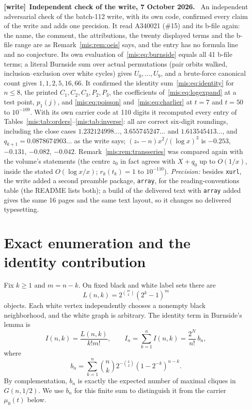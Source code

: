 \documentclass[11pt]{article}
\theoremstyle{remark}\newtheorem{remark}[theorem]{Remark}
\newenvironment{writenote}[1][]{\par\smallskip\begingroup\small
 \noindent\textbf{[write]}\if\relax\detokenize{#1}\relax\else~\textbf{#1.}\fi\ }%
 {\par\endgroup\smallskip}
\begin{document}
\begin{writenote}[Independent check of the write, 7 October 2026]
An independent adversarial check of the batch-112 write, with its own code,
confirmed every claim of the write and adds one precision. It read A340021
(\#15) and its b-file again: the name, the comment, the attributions, the
twenty displayed terms and the b-file range are as Remark~\ref{mis:rem:oeis}
says, and the entry has no formula line and no conjecture. Its own evaluation
of~\eqref{mis:eq:burnside} equals all 41 b-file terms; a literal Burnside sum
over actual permutations (pair orbits walked, inclusion--exclusion over white
cycles) gives $U_0,\ldots,U_9$, and a brute-force canonical count gives
$1,1,2,5,16,66$. It confirmed the identity sum~\eqref{mis:eq:identity} for
$n\le8$, the printed $C_1,C_2,C_3,P_2,P_3$, the coefficients
of~\eqref{mis:eq:logexpand} at a test point, $p_1(j)$, and
\eqref{mis:eq:poisson} and~\eqref{mis:eq:charlier} at $t=7$ and $t=50$ to
$10^{-109}$. With its own carrier code at 110 digits it recomputed every entry
of Tables~\ref{mis:tab:orders}--\ref{mis:tab:inverse}: all are correct
six-digit roundings, including the close cases $1.232124998\ldots$,
$3.655745247\ldots$ and $1.613545413\ldots$, and
$q_{k+1}=0.0878674903\ldots$ as the write says; $(z_*-n)x^2/(\log x)^3$ is
$-0.253$, $-0.131$, $-0.082$, $-0.042$. Remark~\ref{mis:rem:transseries} was
compared again with the volume's statements (the centre $z_0$ in fact agrees
with $X+q_0$ up to $O(1/x)$, inside the stated $O(\log x/x)$; $r_k(t_k)=1$
to $10^{-110}$). \emph{Precision:} besides \texttt{xurl}, the write added a
second preamble package, \texttt{array}, for the reading-conventions table (the
README lists both); a build of the delivered text with \texttt{array} added
gives the same 16 pages and the same text layout, so it changes no delivered
typesetting.
\end{writenote}

\section{Exact enumeration and the identity contribution}
Fix $k\ge1$ and $m=n-k$. On fixed black and white label sets there are
\[
 L(n,k)=2^{\binom m2}(2^k-1)^m
\]
objects. Each white vertex independently chooses a nonempty black neighborhood, and the white graph is arbitrary. The identity term in Burnside's lemma is
\begin{equation}\label{mis:eq:identity}
 I(n,k)=\frac{L(n,k)}{k!m!},\qquad
 I_n=\sum_{k=1}^n I(n,k)=\frac{2^N}{n!}\,b_n,
\end{equation}
where
\begin{equation}\label{mis:eq:bn}
 b_n=\sum_{k=1}^n\binom nk2^{-\binom k2}(1-2^{-k})^{n-k}.
\end{equation}
By complementation, $b_n$ is exactly the expected number of maximal cliques in $G(n,1/2)$. We use $b_n$ for this finite sum to distinguish it from the carrier $\mu_0(t)$ below.
\end{document}
